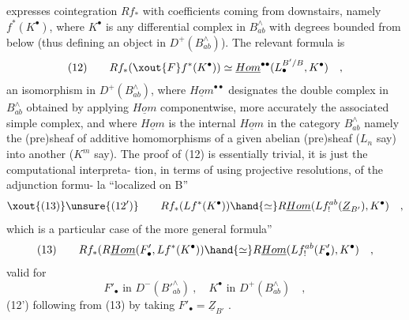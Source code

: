 
expresses cointegration $Rf_*$ with coefficients 
coming from downstairs, namely $f^*(K^\bullet)$, where $K^\bullet$ is any differential 
complex in $B^\wedge_{ab}$ with degrees bounded from below (thus defining an object
in $D^+(B^\wedge_{ab})$). The relevant formula is
\[ (12) \qquad Rf_*(\xout{F}f^*(K^\bullet)) \simeq \underline{Hom}^{\bullet\bullet}(L_\bullet^{B'/B} , K^\bullet) \quad , \]
an isomorphism in $D^+(B^\wedge_{ab})$, where $\underline{Hom}^{\bullet\bullet}$ designates the double complex
in $B^\wedge_{ab}$ obtained by applying $\underline{Hom}$ componentwise, more accurately the
associated simple complex, and where $\underline{Hom}$ is the internal $\underline{Hom}$ in the
category $B^\wedge_{ab}$ namely the  (pre)sheaf of additive homomorphisms of
a given abelian (pre)sheaf ($L_n$ say) into another ($K^m$ say). The proof
of (12) is essentially trivial, it is just the computational interpreta-%
tion, in terms of using projective resolutions, of the adjunction formu-%
la ``localized on B''
\[ \xout{(13)}\unsure{(12')} \qquad Rf_*(Lf^*(K^\bullet)) \hand{\simeq} R\underline{Hom}(Lf^{ab}_!(\underline{Z}_{B'}), K^\bullet) \quad , \]
which is a particular case of the more general  formula''
\[ (13) \qquad Rf_*(R\underline{Hom}(F'_\bullet , Lf^*(K^\bullet)) \hand{\simeq} R\underline{Hom}(Lf^{ab}_!(F'_\bullet), K^\bullet) \quad , \]
valid for
\[ F'_\bullet \text{ in } D^-(B'^\wedge_{ab}) \ , \quad K^\bullet \text{ in } D^+(B^\wedge_{ab}) \quad , \]
(12') following from (13) by taking $F'_\bullet = \underline{Z}_{B'}$ .

